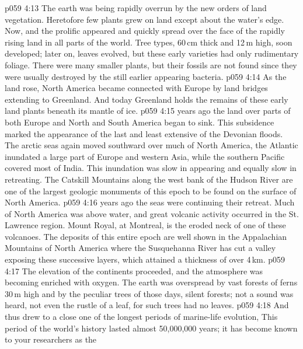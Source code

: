 \vs p059 4:13 The earth was being rapidly overrun by the new orders of land vegetation. Heretofore few plants grew on land except about the water’s edge. Now, and  the prolific  appeared and quickly spread over the face of the rapidly rising land in all parts of the world. Tree types, 60\,cm thick and 12\,m high, soon developed; later on, leaves evolved, but these early varieties had only rudimentary foliage. There were many smaller plants, but their fossils are not found since they were usually destroyed by the still earlier appearing bacteria.
\vs p059 4:14 As the land rose, North America became connected with Europe by land bridges extending to Greenland. And today Greenland holds the remains of these early land plants beneath its mantle of ice.
\vs p059 4:15 \pc {} years ago the land over parts of both Europe and North and South America began to sink. This subsidence marked the appearance of the last and least extensive of the Devonian floods. The arctic seas again moved southward over much of North America, the Atlantic inundated a large part of Europe and western Asia, while the southern Pacific covered most of India. This inundation was slow in appearing and equally slow in retreating. The Catskill Mountains along the west bank of the Hudson River are one of the largest geologic monuments of this epoch to be found on the surface of North America.
\vs p059 4:16 \pc {} years ago the seas were continuing their retreat. Much of North America was above water, and great volcanic activity occurred in the St. Lawrence region. Mount Royal, at Montreal, is the eroded neck of one of these volcanoes. The deposits of this entire epoch are well shown in the Appalachian Mountains of North America where the Susquehanna River has cut a valley exposing these successive layers, which attained a thickness of over 4\,km.
\vs p059 4:17 \pc The elevation of the continents proceeded, and the atmosphere was becoming enriched with oxygen. The earth was overspread by vast forests of ferns 30\,m high and by the peculiar trees of those days, silent forests; not a sound was heard, not even the rustle of a leaf, for such trees had no leaves.
\vs p059 4:18 \pc And thus drew to a close one of the longest periods of marine\hyp{}life evolution,  This period of the world’s history lasted almost 50,000,000 years; it has become known to your researchers as the 
